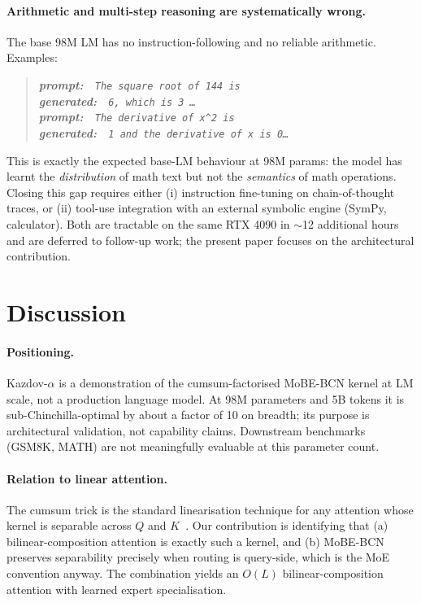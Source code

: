 \documentclass[11pt]{article}
\begin{document}
\paragraph{Arithmetic and multi-step reasoning are systematically wrong.}
The base 98M LM has no instruction-following and no reliable
arithmetic.  Examples:
\begin{quote}\itshape
\textbf{prompt:}~~\texttt{The square root of 144 is}\\
\textbf{generated:}~~\texttt{6, which is 3 \ldots}\\[2pt]
\textbf{prompt:}~~\texttt{The derivative of x\^{}2 is}\\
\textbf{generated:}~~\texttt{1 and the derivative of x is 0\ldots}
\end{quote}
This is exactly the expected base-LM behaviour at 98M params: the
model has learnt the \emph{distribution} of math text but not the
\emph{semantics} of math operations.  Closing this gap requires
either (i) instruction fine-tuning on chain-of-thought traces, or
(ii) tool-use integration with an external symbolic engine (SymPy,
calculator).  Both are tractable on the same RTX 4090 in $\sim$12
additional hours and are deferred to follow-up work; the present
paper focuses on the architectural contribution.

\section{Discussion}

\paragraph{Positioning.}
Kazdov-$\alpha$ is a demonstration of the cumsum-factorised MoBE-BCN
kernel at LM scale, not a production language model. At 98M parameters
and 5B tokens it is sub-Chinchilla-optimal by about a factor of 10 on
breadth; its purpose is architectural validation, not capability claims.
Downstream benchmarks (GSM8K, MATH) are not meaningfully evaluable at
this parameter count.

\paragraph{Relation to linear attention.}
The cumsum trick is the standard linearisation technique for any
attention whose kernel is separable across $Q$ and
$K$~\citep{katharopoulos2020transformers}. Our contribution is identifying
that (a) bilinear-composition attention is exactly such a kernel, and
(b) MoBE-BCN preserves separability precisely when routing is query-side,
which is the MoE convention anyway. The combination yields an $O(L)$
bilinear-composition attention with learned expert specialisation.
\end{document}
